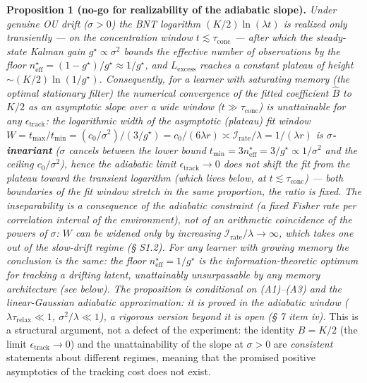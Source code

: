 \documentclass[12pt]{iopart}
\begin{document}
\textbf{Proposition 1 (no-go for realizability of the adiabatic slope).} \emph{Under genuine OU drift (\(\sigma > 0\)) the BNT logarithm \((K/2)\ln(\lambda t)\) is realized only transiently --- on the concentration window \(t \lesssim \tau_{\text{conc}}\) --- after which the steady-state Kalman gain \(g^\star \propto \sigma^2\) bounds the effective number of observations by the floor \(n_{\text{eff}}^\star = (1-g^\star)/g^\star \approx 1/g^\star\), and \(L_{\text{excess}}\) reaches a constant plateau of height \(\sim (K/2)\ln(1/g^\star)\). Consequently, for a learner with saturating memory (the optimal stationary filter) the numerical convergence of the fitted coefficient \(\hat B\) to \(K/2\) as an asymptotic slope over a wide window (\(t \gg \tau_{\text{conc}}\)) is unattainable for any \(\epsilon_{\text{track}}\): the logarithmic width of the \emph{asymptotic (plateau) fit window} \(W = t_{\max}/t_{\min} = (c_0/\sigma^2)/(3/g^\star) = c_0/(6\lambda r) \asymp \mathcal I_{\text{rate}}/\lambda = 1/(\lambda r)\) is \textbf{\(\sigma\)-invariant} (\(\sigma\) cancels between the lower bound \(t_{\min} = 3n_{\text{eff}}^\star = 3/g^\star \propto 1/\sigma^2\) and the ceiling \(c_0/\sigma^2\)), hence the adiabatic limit \(\epsilon_{\text{track}}\to0\) does \emph{not} shift the fit from the plateau toward the transient logarithm (which lives below, at \(t\lesssim\tau_{\text{conc}}\)) --- both boundaries of the fit window stretch in the same proportion, the ratio is fixed. The inseparability is a consequence of the \emph{adiabatic constraint} (a fixed Fisher rate per correlation interval of the environment), not of an arithmetic coincidence of the powers of \(\sigma\): \(W\) can be widened only by increasing \(\mathcal I_{\text{rate}}/\lambda \to \infty\), which takes one out of the slow-drift regime (§ S1.2). For any learner with growing memory the conclusion is the same: the floor \(n_{\text{eff}}^\star = 1/g^\star\) is the information-theoretic optimum for tracking a drifting latent, unattainably unsurpassable by any memory architecture (see below). The proposition is conditional on (A1)--(A3) and the linear-Gaussian adiabatic approximation: it is proved in the adiabatic window (\(\lambda\tau_{\text{relax}}\ll1\), \(\sigma^2/\lambda\ll1\)), a rigorous version beyond it is open (§ 7 item iv).} This is a structural argument, not a defect of the experiment: the identity \(B = K/2\) (the limit \(\epsilon_{\text{track}}\to 0\)) and the unattainability of the slope at \(\sigma > 0\) are \emph{consistent} statements about different regimes, meaning that the promised positive asymptotics of the tracking cost does not exist.
\end{document}
